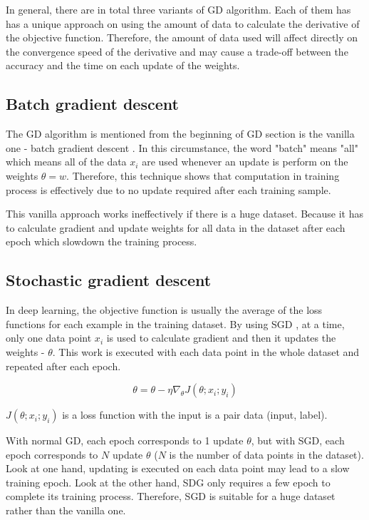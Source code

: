 	In general, there are in total three variants of GD algorithm. Each of them has has a unique approach on using the amount of data to calculate the derivative of the objective function. Therefore, the amount of data used will affect directly on the convergence speed of the derivative and may cause a trade-off between the accuracy and the time on each update of the weights.
	
	
	\subsection{Batch gradient descent}
	\label{subsection:batchGD}
	\noindent

	The GD algorithm is mentioned from the beginning of GD section is the vanilla one - batch gradient descent \cite{gdoverview}. In this circumstance, the word "batch" means "all" which means all of the data $x_i$ are used whenever an update is perform on the weights $\theta = w$. Therefore, this technique shows that computation in training process is effectively due to no update required after each training sample.
	
	This vanilla approach works ineffectively if there is a huge dataset. Because it has to calculate gradient and update weights for all data in the dataset after each epoch which slowdown the training process.
	
	\subsection{Stochastic gradient descent}
	\label{subsection:SGD}
	\noindent

	In deep learning, the objective function is usually the average of the loss functions for each example in the training dataset. By using SGD \cite{gdoverview}, at a time, only one data point $x_i$ is used to calculate gradient and then it updates the weights -  $\theta$. This work is executed with each data point in the whole dataset and repeated after each epoch. 
	
	\[\theta = \theta - \eta \nabla_{\theta} J(\theta; x_i; y_i)\]
	
	\noindent
	$ J(\theta; x_i; y_i)$ is a loss function with the input is a pair data (input, label).
	
	With normal GD, each epoch corresponds to 1 update $\theta$, but with SGD, each epoch corresponds to $N$ update $\theta$ ($N$ is the number of data points in the dataset). Look at one hand, updating is executed on each data point may lead to a slow training epoch. Look at the other hand, SDG only requires a few epoch to complete its training process. Therefore, SGD is suitable for a huge dataset rather than the vanilla one.
	
